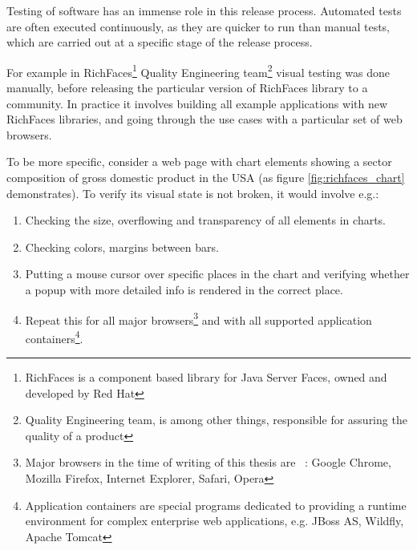 \documentclass[11pt,oneside,final]{fithesis2}
\begin{document}
  Testing of software has an immense role in this release process. Automated tests are often executed continuously, as they are quicker to run than manual tests, 
  which are carried out at a specific stage of the release process.
  
  For example in RichFaces\footnote{RichFaces is a component based library for Java Server Faces, owned and developed by Red Hat} Quality Engineering 
  team\footnote{Quality Engineering team, is among other things, responsible for assuring the quality of a product} visual testing was done manually, before releasing 
  the particular version of RichFaces library to a community. In practice it involves building all example applications with new RichFaces libraries, and going
  through the use cases with a particular set of web browsers. 
  
  To be more specific, consider a web page with chart elements showing a sector composition of gross domestic product in the USA (as figure \ref{fig:richfaces_chart} demonstrates).
  To verify its visual state is not broken, it would involve e.g.:
  \begin{enumerate}
   \item Checking the size, overflowing and transparency of all elements in charts.
   \item Checking colors, margins between bars.
   \item Putting a mouse cursor over specific places in the chart and verifying whether a popup with more detailed info is rendered in the correct place.
   \item Repeat this for all major browsers\footnote{\label{footnote:majorBrowsers}Major browsers in the time of writing of this thesis are ~\citep{majorBrowsers}: Google Chrome, Mozilla Firefox, Internet Explorer, Safari, Opera} 
   and with all supported application containers\footnote{Application containers are special programs 
   dedicated to providing a runtime environment for complex enterprise web applications, e.g. JBoss AS, Wildfly, Apache Tomcat}.
  \end{enumerate}
  
\end{document}
